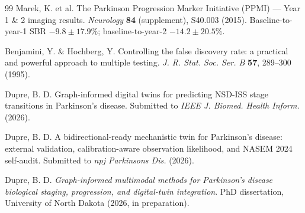 \begin{thebibliography}{99}
 Marek, K. et al. The Parkinson Progression Marker Initiative (PPMI) --- Year 1 \& 2 imaging results. \textit{Neurology} \textbf{84} (supplement), S40.003 (2015). Baseline-to-year-1 SBR $-9.8 \pm 17.9\%$; baseline-to-year-2 $-14.2 \pm 20.5\%$.

 Benjamini, Y. \& Hochberg, Y. Controlling the false discovery rate: a practical and powerful approach to multiple testing. \textit{J. R. Stat. Soc. Ser. B} \textbf{57}, 289--300 (1995).

 Dupre, B. D. Graph-informed digital twins for predicting NSD-ISS stage transitions in Parkinson's disease. Submitted to \textit{IEEE J. Biomed. Health Inform.} (2026).

 Dupre, B. D. A bidirectional-ready mechanistic twin for Parkinson's disease: external validation, calibration-aware observation likelihood, and NASEM 2024 self-audit. Submitted to \textit{npj Parkinsons Dis.} (2026).

 Dupre, B. D. \textit{Graph-informed multimodal methods for Parkinson's disease biological staging, progression, and digital-twin integration}. PhD dissertation, University of North Dakota (2026, in preparation).

\end{thebibliography}
